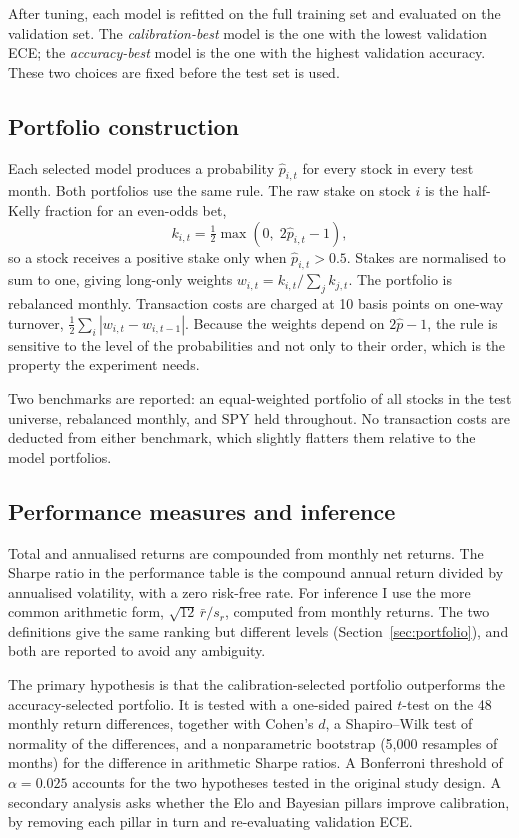 \documentclass[11pt,a4paper]{article}
\begin{document}
After tuning, each model is refitted on the full training set and evaluated on the validation set. The \emph{calibration-best} model is the one with the lowest validation ECE; the \emph{accuracy-best} model is the one with the highest validation accuracy. These two choices are fixed before the test set is used.

\subsection{Portfolio construction}\label{sec:construction}

Each selected model produces a probability $\hat{p}_{i,t}$ for every stock in every test month. Both portfolios use the same rule. The raw stake on stock $i$ is the half-Kelly fraction for an even-odds bet,
\begin{equation}
k_{i,t}=\tfrac{1}{2}\max\!\left(0,\;2\hat{p}_{i,t}-1\right),
\end{equation}
so a stock receives a positive stake only when $\hat{p}_{i,t}>0.5$. Stakes are normalised to sum to one, giving long-only weights $w_{i,t}=k_{i,t}/\sum_j k_{j,t}$. The portfolio is rebalanced monthly. Transaction costs are charged at 10 basis points on one-way turnover, $\tfrac{1}{2}\sum_i |w_{i,t}-w_{i,t-1}|$. Because the weights depend on $2\hat{p}-1$, the rule is sensitive to the level of the probabilities and not only to their order, which is the property the experiment needs.

Two benchmarks are reported: an equal-weighted portfolio of all stocks in the test universe, rebalanced monthly, and SPY held throughout. No transaction costs are deducted from either benchmark, which slightly flatters them relative to the model portfolios.

\subsection{Performance measures and inference}

Total and annualised returns are compounded from monthly net returns. The Sharpe ratio in the performance table is the compound annual return divided by annualised volatility, with a zero risk-free rate. For inference I use the more common arithmetic form, $\sqrt{12}\,\bar{r}/s_r$, computed from monthly returns. The two definitions give the same ranking but different levels (Section~\ref{sec:portfolio}), and both are reported to avoid any ambiguity.

The primary hypothesis is that the calibration-selected portfolio outperforms the accuracy-selected portfolio. It is tested with a one-sided paired $t$-test on the 48 monthly return differences, together with Cohen's $d$, a Shapiro--Wilk test of normality of the differences, and a nonparametric bootstrap (5{,}000 resamples of months) for the difference in arithmetic Sharpe ratios. A Bonferroni threshold of $\alpha=0.025$ accounts for the two hypotheses tested in the original study design. A secondary analysis asks whether the Elo and Bayesian pillars improve calibration, by removing each pillar in turn and re-evaluating validation ECE.
\end{document}
